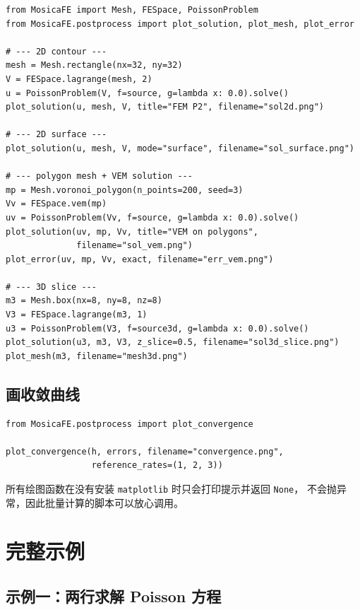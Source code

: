 \documentclass[UTF8,11pt,oneside]{ctexbook}
\theoremstyle{definition}
\theoremstyle{plain}
\newenvironment{caution}{%
  \begin{tcolorbox}[colback=orange!5,colframe=orange!55,title=注意,fonttitle=\bfseries]%
}{%
  \end{tcolorbox}%
}
\newcommand{\code}[1]{\texttt{#1}}
\begin{document}
\begin{lstlisting}[language=MosicaFE,caption={示例 9.1：2D 与 3D 解的绘制}]
from MosicaFE import Mesh, FESpace, PoissonProblem
from MosicaFE.postprocess import plot_solution, plot_mesh, plot_error

# --- 2D contour ---
mesh = Mesh.rectangle(nx=32, ny=32)
V = FESpace.lagrange(mesh, 2)
u = PoissonProblem(V, f=source, g=lambda x: 0.0).solve()
plot_solution(u, mesh, V, title="FEM P2", filename="sol2d.png")

# --- 2D surface ---
plot_solution(u, mesh, V, mode="surface", filename="sol_surface.png")

# --- polygon mesh + VEM solution ---
mp = Mesh.voronoi_polygon(n_points=200, seed=3)
Vv = FESpace.vem(mp)
uv = PoissonProblem(Vv, f=source, g=lambda x: 0.0).solve()
plot_solution(uv, mp, Vv, title="VEM on polygons",
              filename="sol_vem.png")
plot_error(uv, mp, Vv, exact, filename="err_vem.png")

# --- 3D slice ---
m3 = Mesh.box(nx=8, ny=8, nz=8)
V3 = FESpace.lagrange(m3, 1)
u3 = PoissonProblem(V3, f=source3d, g=lambda x: 0.0).solve()
plot_solution(u3, m3, V3, z_slice=0.5, filename="sol3d_slice.png")
plot_mesh(m3, filename="mesh3d.png")
\end{lstlisting}

\section{画收敛曲线}

\begin{lstlisting}[language=MosicaFE,caption={示例 9.2：收敛曲线}]
from MosicaFE.postprocess import plot_convergence

plot_convergence(h, errors, filename="convergence.png",
                 reference_rates=(1, 2, 3))
\end{lstlisting}

\begin{caution}
所有绘图函数在没有安装 \code{matplotlib} 时只会打印提示并返回 \code{None}，
不会抛异常，因此批量计算的脚本可以放心调用。
\end{caution}

\chapter{完整示例}
\label{chap:examples}

\section{示例一：两行求解 Poisson 方程}
\end{document}
